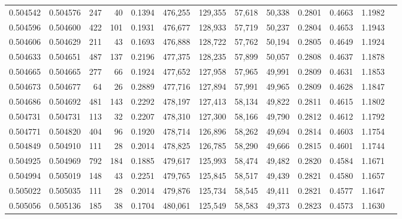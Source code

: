 \begin{tabular}{rrrrrrrrrrrrr}
0.504542 & 0.504576 &   247 &    40 &                                     0.1394 & 476,255 & 129,355 &  57,618 &  50,338 & 0.2801 & 0.4663 & 1.1982 \\
0.504596 & 0.504600 &   422 &   101 &                                     0.1931 & 476,677 & 128,933 &  57,719 &  50,237 & 0.2804 & 0.4653 & 1.1943 \\
0.504606 & 0.504629 &   211 &    43 &                                     0.1693 & 476,888 & 128,722 &  57,762 &  50,194 & 0.2805 & 0.4649 & 1.1924 \\
0.504633 & 0.504651 &   487 &   137 &                                     0.2196 & 477,375 & 128,235 &  57,899 &  50,057 & 0.2808 & 0.4637 & 1.1878 \\
0.504665 & 0.504665 &   277 &    66 &                                     0.1924 & 477,652 & 127,958 &  57,965 &  49,991 & 0.2809 & 0.4631 & 1.1853 \\
0.504673 & 0.504677 &    64 &    26 &                                     0.2889 & 477,716 & 127,894 &  57,991 &  49,965 & 0.2809 & 0.4628 & 1.1847 \\
0.504686 & 0.504692 &   481 &   143 &                                     0.2292 & 478,197 & 127,413 &  58,134 &  49,822 & 0.2811 & 0.4615 & 1.1802 \\
0.504731 & 0.504731 &   113 &    32 &                                     0.2207 & 478,310 & 127,300 &  58,166 &  49,790 & 0.2812 & 0.4612 & 1.1792 \\
0.504771 & 0.504820 &   404 &    96 &                                     0.1920 & 478,714 & 126,896 &  58,262 &  49,694 & 0.2814 & 0.4603 & 1.1754 \\
0.504849 & 0.504910 &   111 &    28 &                                     0.2014 & 478,825 & 126,785 &  58,290 &  49,666 & 0.2815 & 0.4601 & 1.1744 \\
0.504925 & 0.504969 &   792 &   184 &                                     0.1885 & 479,617 & 125,993 &  58,474 &  49,482 & 0.2820 & 0.4584 & 1.1671 \\
0.504994 & 0.505019 &   148 &    43 &                                     0.2251 & 479,765 & 125,845 &  58,517 &  49,439 & 0.2821 & 0.4580 & 1.1657 \\
0.505022 & 0.505035 &   111 &    28 &                                     0.2014 & 479,876 & 125,734 &  58,545 &  49,411 & 0.2821 & 0.4577 & 1.1647 \\
0.505056 & 0.505136 &   185 &    38 &                                     0.1704 & 480,061 & 125,549 &  58,583 &  49,373 & 0.2823 & 0.4573 & 1.1630 \\

\end{tabular}
